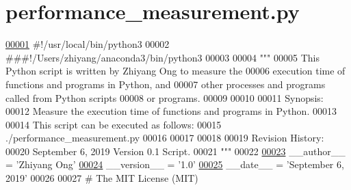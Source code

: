 \hypertarget{performance__measurement_8py_source}{}\section{performance\+\_\+measurement.\+py}
\label{performance__measurement_8py_source}

\begin{DoxyCode}
\hypertarget{performance__measurement_8py_source_l00001}{}\hyperlink{namespaceutilities_1_1timing__measurements_1_1performance__measurement}{00001} \textcolor{comment}{#!/usr/local/bin/python3}
00002 \textcolor{comment}{###!/Users/zhiyang/anaconda3/bin/python3}
00003 
00004 \textcolor{stringliteral}{"""}
00005 \textcolor{stringliteral}{    This Python script is written by Zhiyang Ong to measure the}
00006 \textcolor{stringliteral}{        execution time of functions and programs in Python, and}
00007 \textcolor{stringliteral}{        other processes and programs called from Python scripts}
00008 \textcolor{stringliteral}{        or programs.}
00009 \textcolor{stringliteral}{}
00010 \textcolor{stringliteral}{}
00011 \textcolor{stringliteral}{    Synopsis:}
00012 \textcolor{stringliteral}{    Measure the execution time of functions and programs in Python.}
00013 \textcolor{stringliteral}{}
00014 \textcolor{stringliteral}{    This script can be executed as follows:}
00015 \textcolor{stringliteral}{    ./performance\_measurement.py}
00016 \textcolor{stringliteral}{}
00017 \textcolor{stringliteral}{}
00018 \textcolor{stringliteral}{}
00019 \textcolor{stringliteral}{    Revision History:}
00020 \textcolor{stringliteral}{    September 6, 2019           Version 0.1 Script.}
00021 \textcolor{stringliteral}{"""}
00022 
\hypertarget{performance__measurement_8py_source_l00023}{}\hyperlink{namespaceutilities_1_1timing__measurements_1_1performance__measurement_ae9ebc6598ae207bada8114a41262cd98}{00023} \_\_author\_\_ = \textcolor{stringliteral}{'Zhiyang Ong'}
\hypertarget{performance__measurement_8py_source_l00024}{}\hyperlink{namespaceutilities_1_1timing__measurements_1_1performance__measurement_acaa159634d0efe832d19c3272a52ee1f}{00024} \_\_version\_\_ = \textcolor{stringliteral}{'1.0'}
\hypertarget{performance__measurement_8py_source_l00025}{}\hyperlink{namespaceutilities_1_1timing__measurements_1_1performance__measurement_a7d7385628a9772dfe4b0d7ff51942c6a}{00025} \_\_date\_\_ = \textcolor{stringliteral}{'September 6, 2019'}
00026 
00027 \textcolor{comment}{#   The MIT License (MIT)}

\end{DoxyCode}
